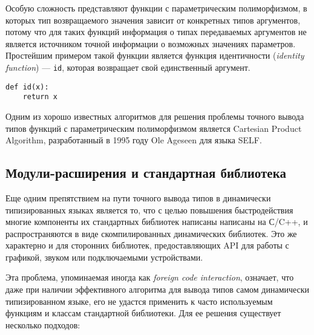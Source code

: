 Особую сложность представляют функции с параметрическим полиморфизмом, в
которых тип возвращаемого значения зависит от конкретных типов аргументов, 
потому что для таких функций информация о типах передаваемых аргументов не
является источником точной информации о возможных значениях параметров.
Простейшим примером такой функции является функция идентичности (\emph{identity
function}) --- \texttt{id}, которая возвращает свой единственный аргумент.

\begin{lstlisting}[caption={Функция идентичности.}]
def id(x):
    return x
\end{lstlisting}

Одним из хорошо известных алгоритмов для решения проблемы точного вывода типов
функций с параметрическим полиморфизмом является Cartesian Product Algorithm, 
разработанный в 1995 году Ole Ageseen для языка SELF. 




\subsection{Модули-расширения и стандартная библиотека}
\label{sec:extensions-and-stdlib}

Еще одним препятствием на пути точного вывода типов в динамически типизированных
языках является то, что с целью повышения быстродействия многие компоненты их
стандартных библиотек написаны написаны на С/C++, и распространяются в
виде скомпилированных динамических библиотек. Это же характерно и для сторонних
библиотек, предоставляющих API для работы с графикой, звуком или подключаемыми
устройствами.

Эта проблема, упоминаемая иногда как \emph{foreign code interaction}, означает, что даже при
наличии эффективного алгоритма для вывода типов самом динамически типизированном
языке, его не удастся применить к часто используемым функциям и классам
стандартной библиотеки. Для ее решения существует несколько подходов:

